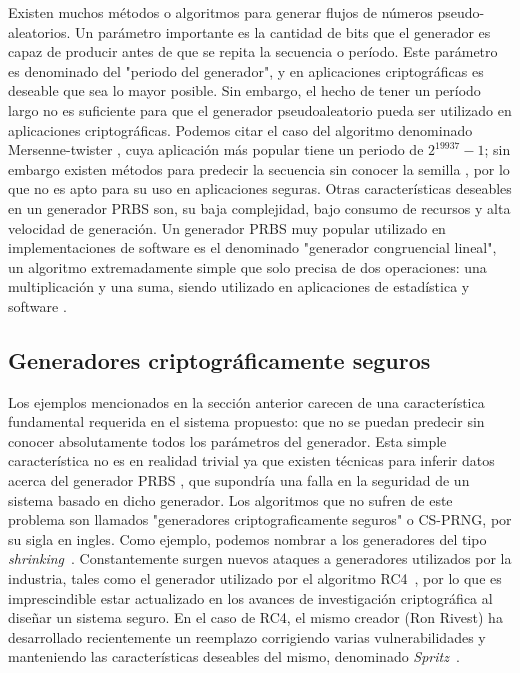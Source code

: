 Existen muchos métodos o algoritmos para generar flujos de números pseudo-aleatorios. Un parámetro importante es la cantidad de bits que el generador es capaz de producir antes de que se repita la secuencia o período. Este parámetro es denominado  del "periodo del generador", y en aplicaciones criptográficas es deseable que sea lo mayor posible. Sin embargo, el hecho de tener un período largo no es suficiente para que el generador pseudoaleatorio pueda ser utilizado en aplicaciones criptográficas. Podemos citar el caso del algoritmo denominado Mersenne-twister \cite{matsumoto1998mersenne}, cuya aplicación más popular tiene un periodo de $2^{19937}-1$; sin embargo existen métodos para predecir la secuencia sin conocer la semilla \cite{argyros2012forgot}, por lo que no es apto para su uso en aplicaciones seguras.
Otras características deseables en un generador PRBS son, su baja complejidad, bajo consumo de recursos y alta velocidad de generación. Un generador PRBS muy popular utilizado en implementaciones de software es el denominado "generador congruencial lineal", un algoritmo extremadamente simple que solo precisa de dos operaciones: una multiplicación y una suma, siendo utilizado en aplicaciones de estadística y software \cite{park1988random}.

\subsection{Generadores criptográficamente seguros}
\label{cap2:prng}
Los ejemplos mencionados en la sección anterior carecen de una característica fundamental requerida en el sistema propuesto: que no se puedan predecir sin conocer absolutamente todos los parámetros del generador. Esta simple característica no es en realidad trivial ya que existen técnicas para inferir datos acerca del generador PRBS \cite{argyros2012forgot}, que supondría una falla en la seguridad de un sistema basado en dicho generador. Los algoritmos que no sufren de este problema son llamados "generadores criptograficamente seguros" o CS-PRNG, por su sigla en ingles. Como ejemplo, podemos nombrar a los generadores del tipo \textit{shrinking}~\cite{coppersmith1994shrinking}.
Constantemente surgen nuevos ataques a generadores utilizados por la industria, tales como el generador utilizado por el algoritmo RC4~\cite{vaudenay2007passive}, por lo que es imprescindible estar actualizado en los avances de investigación criptográfica al diseñar un sistema seguro. En el caso de RC4, el mismo creador (Ron Rivest) ha desarrollado recientemente un reemplazo corrigiendo varias vulnerabilidades y manteniendo las características deseables del mismo, denominado \textit{Spritz}~\cite{RS14}. 

